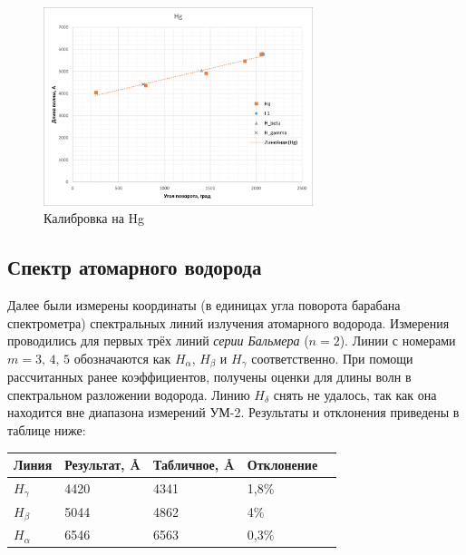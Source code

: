 \begin{figure}[H]
    \centering
    \includegraphics[width=0.7\textwidth]{img/HgPlot.png}
    \caption{Калибровка на Hg}
    \label{fig:Hg}
\end{figure}

\subsection{Спектр атомарного водорода}
Далее были измерены координаты (в единицах угла поворота барабана спектрометра) спектральных линий излучения атомарного водорода. Измерения проводились для первых трёх линий \textit{серии Бальмера} ($n=2$). Линии с номерами $m = 3,\,4,\,5$ обозначаются как $H_\alpha,\,H_\beta$ и $H_\gamma$ соответственно. При помощи рассчитанных ранее коэффициентов, получены оценки для длины волн в спектральном разложении водорода. Линию $H_\delta$ снять не удалось, так как она находится вне диапазона измерений УМ-2. Результаты и отклонения приведены в таблице ниже:
\begin{table}[!ht]
    \centering
    \begin{tabular}{|l|l|l|l|l|}
    \hline
        Линия & Результат, \r{A} & Табличное, \r{A} & Отклонение \\ \hline
        $H_\gamma$ & 4420 & 4341 & 1,8\% \\ \hline
        $H_\beta$ & 5044 & 4862 & 4\% \\ \hline
        $H_\alpha$ & 6546 & 6563 & 0,3\% \\ \hline
    \end{tabular}
\end{table}


